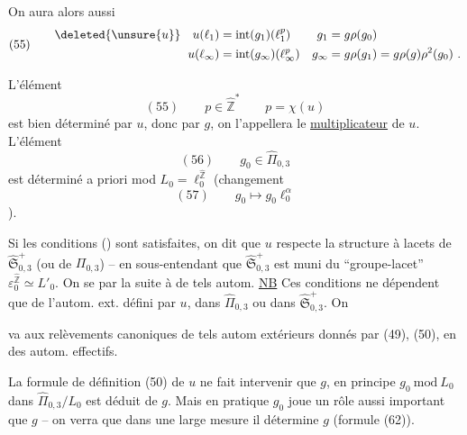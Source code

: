 On aura alors aussi
\[
(55)\qquad
\begin{aligned}
\deleted{\unsure{u}}\quad u(\ell_1)&=\operatorname{int}(g_1)(\ell_1^p)&
g_1&=g\rho(g_0)\\
u(\ell_\infty)&=\operatorname{int}(g_\infty)(\ell_\infty^p)&
g_\infty&=g\rho(g_1)=g\rho(g)\rho^2(g_0)\ .
\end{aligned}
\]

L'élément 
\[
(55)\qquad p\in\widehat{\mathbb Z}^{\ast}\qquad p=\chi(u)
\]
est bien déterminé par $u$, donc par $g$, on l'appellera le \uline{multiplicateur} de $u$. L'élément 
\[
(56)\qquad g_0\in\widehat{\Pi}_{0,3}
\]
est déterminé a priori mod $L_0=\ell_0^{\widehat{\mathbb Z}}$ (changement
\[
(57)\qquad g_0\longmapsto g_0\ell_0^\alpha
\]
).


Si les conditions  () sont satisfaites, on dit que $u$ respecte la structure à lacets de $\widehat{\mathfrak S}_{0,3}^{+}$ (ou de $\Pi_{0,3}$) -- en sous-entendant que $\widehat{\mathfrak S}_{0,3}^{+}$ est muni du ``groupe-lacet'' $\varepsilon_0^{\widehat{\mathbb Z}}\simeq L'_0$. On se  par la suite à de tels autom. \uline{NB} Ces conditions ne dépendent que de l'autom. ext. défini par $u$, dans $\widehat{\Pi}_{0,3}$ ou dans $\widehat{\mathfrak S}_{0,3}^{+}$. On


va  aux relèvements canoniques de tels autom extérieurs donnés par (49), (50), en des autom. effectifs.

La formule de définition (50) de $u$ ne fait intervenir que $g$, en principe $g_0\ \mathrm{mod}\ L_0$ dans $\widehat{\Pi}_{0,3}/L_0$ est déduit de $g$. Mais en pratique $g_0$ joue un rôle aussi important que $g$ -- on verra que dans une large mesure il détermine $g$ (formule (62)).

